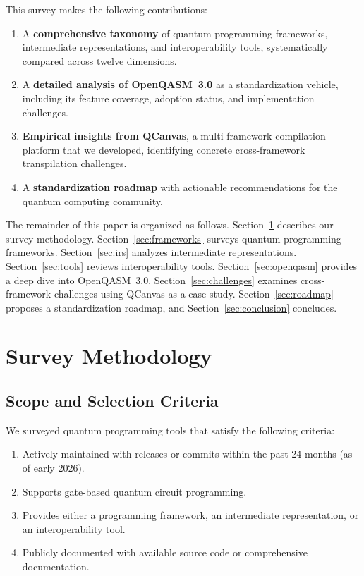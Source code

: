 \documentclass[journal]{IEEEtran}
\begin{document}
This survey makes the following contributions:

\begin{enumerate}
    \item A \textbf{comprehensive taxonomy} of quantum programming frameworks, intermediate representations, and interoperability tools, systematically compared across twelve dimensions.
    \item A \textbf{detailed analysis of OpenQASM~3.0} as a standardization vehicle, including its feature coverage, adoption status, and implementation challenges.
    \item \textbf{Empirical insights from QCanvas}, a multi-framework compilation platform that we developed, identifying concrete cross-framework transpilation challenges.
    \item A \textbf{standardization roadmap} with actionable recommendations for the quantum computing community.
\end{enumerate}

The remainder of this paper is organized as follows. Section~\ref{sec:methodology} describes our survey methodology. Section~\ref{sec:frameworks} surveys quantum programming frameworks. Section~\ref{sec:irs} analyzes intermediate representations. Section~\ref{sec:tools} reviews interoperability tools. Section~\ref{sec:openqasm} provides a deep dive into OpenQASM~3.0. Section~\ref{sec:challenges} examines cross-framework challenges using QCanvas as a case study. Section~\ref{sec:roadmap} proposes a standardization roadmap, and Section~\ref{sec:conclusion} concludes.

\section{Survey Methodology}
\label{sec:methodology}

\subsection{Scope and Selection Criteria}

We surveyed quantum programming tools that satisfy the following criteria:
\begin{enumerate}
    \item Actively maintained with releases or commits within the past 24 months (as of early 2026).
    \item Supports gate-based quantum circuit programming.
    \item Provides either a programming framework, an intermediate representation, or an interoperability tool.
    \item Publicly documented with available source code or comprehensive documentation.
\end{enumerate}
\end{document}
